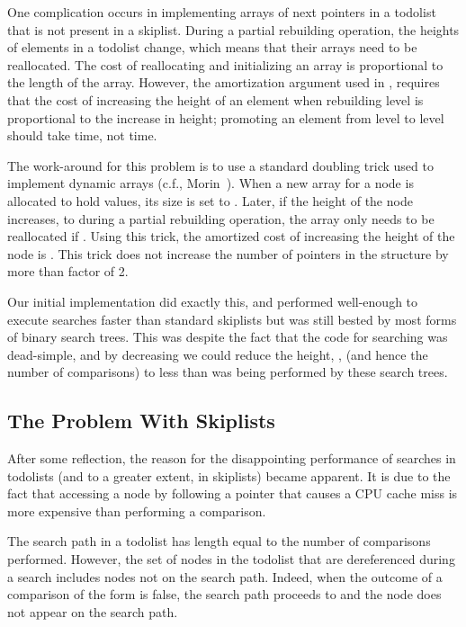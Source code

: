 \documentclass{patmorin}
\begin{document}
One complication occurs in implementing arrays of next pointers in a
todolist that is not present in a skiplist.  During a partial rebuilding
operation, the heights of elements in a todolist change, which means
that their arrays need to be reallocated.  The cost of reallocating and
initializing an array is proportional to the length of the array. However,
the amortization argument used in , requires that the
cost of increasing the height of an element when rebuilding level 
is proportional to the increase in height; promoting an element from
level  to level  should take  time, not  time.

The work-around for this problem is to use a standard
doubling trick used to implement dynamic arrays (c.f.,
Morin~\cite[Section~2.1.2]{morin:open}). When a new array for a node
is allocated to hold  values, its size is set to .  Later, if the height of the node increases, to  during
a partial rebuilding operation, the array only needs to be reallocated
if .  Using this trick, the amortized
cost of increasing the height of the node is .  This trick does not
increase the number of pointers in the structure by more than factor of 2.

Our initial implementation did exactly this, and performed well-enough
to execute searches faster than standard skiplists but was still bested
by most forms of binary search trees.  This was despite the fact that
the code for searching was dead-simple, and by decreasing  we
could reduce the height, , (and hence the number of comparisons)
to less than was being performed by these search trees.

\subsection{The Problem With Skiplists}

After some reflection, the reason for the disappointing performance of
searches in todolists (and to a greater extent, in skiplists) became
apparent. It is due to the fact that accessing a node by following a
pointer that causes a CPU cache miss is more expensive than performing
a comparison.

The search path in a todolist has length equal to the number of
comparisons performed.  However, the set of nodes in the todolist
that are dereferenced during a search includes nodes not on the
search path. Indeed, when the outcome of a comparison of the form
 is false, the search path proceeds
to  and the node  does not appear on
the search path.
\end{document}
